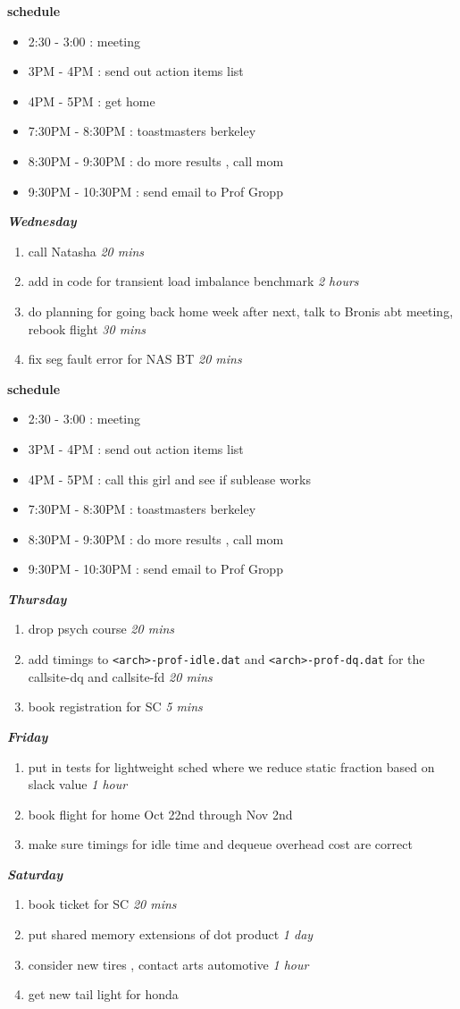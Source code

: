 \documentclass[11pt]{article}
\newcommand{\timeEst}[1]{\textit{#1}}
\begin{document}
\textbf{schedule}
\begin{itemize}
\item 2:30 - 3:00 :  meeting
\item 3PM - 4PM : send out action items list
\item 4PM - 5PM : get home
\item 7:30PM - 8:30PM : toastmasters berkeley
\item 8:30PM - 9:30PM :  do more results , call mom
\item 9:30PM - 10:30PM : send email to Prof Gropp
\end{itemize}


\textbf{\textit{Wednesday}}
\begin{enumerate}
\item call Natasha \timeEst{20 mins}
\item add in code for transient load imbalance benchmark \timeEst{2 hours}
\item do planning for going back home week after next, talk to Bronis abt meeting, rebook flight \timeEst{30 mins}
\item fix seg fault error for NAS BT \timeEst{20 mins}
\end{enumerate}




\textbf{schedule}
\begin{itemize}
\item 2:30 - 3:00 :  meeting
\item 3PM - 4PM : send out action items list
\item 4PM - 5PM : call this girl and see if sublease works

\item 7:30PM - 8:30PM : toastmasters berkeley
\item 8:30PM - 9:30PM :  do more results , call mom
\item 9:30PM - 10:30PM : send email to Prof Gropp
\end{itemize}

\textbf{\textit{Thursday}}
\begin{enumerate}
\item drop psych course \timeEst{20 mins}
\item add timings to \texttt{<arch>-prof-idle.dat} and \texttt{<arch>-prof-dq.dat} for the callsite-dq and callsite-fd  \timeEst{20 mins}
\item book registration for SC \timeEst{5 mins}
\end{enumerate}

\textbf{\textit{Friday}}
\begin{enumerate}
\item put in tests for lightweight sched where we reduce static fraction based on slack value \timeEst{1 hour}
\item book flight for home Oct 22nd through Nov 2nd
\item make sure timings for idle time and dequeue overhead cost are correct
\end{enumerate}

\textbf{\textit{Saturday}}
\begin{enumerate}
\item book ticket for SC \timeEst{20 mins}
\item put shared memory extensions of dot product  \timeEst{1 day}
\item consider new tires , contact arts automotive \timeEst{1 hour}
\item get new tail light for honda
\end{enumerate}

\newpage
\end{document}
